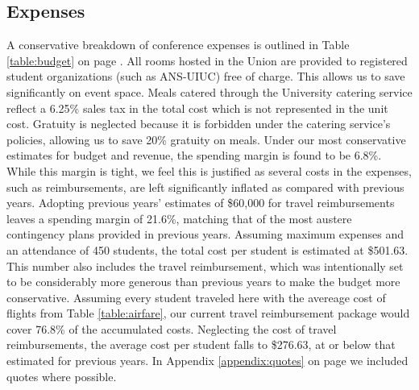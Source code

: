 
\subsection{Expenses}
A conservative breakdown of conference expenses is outlined in Table \ref{table:budget} on page \pageref{table:budget}. All rooms hosted in the Union are provided to registered student organizations (such as ANS-UIUC) free of charge. This allows us to save significantly on event space. Meals catered through the University catering service reflect a 6.25\% sales tax in the total cost which is not represented in the unit cost. Gratuity is neglected because it is forbidden under the catering service’s policies, allowing us to save 20\% gratuity on meals. 
Under our most conservative estimates for budget and revenue, the spending margin is found to be 6.8\%. While this margin is tight, we feel this is justified as several costs in the expenses, such as reimbursements, are left significantly inflated as compared with previous years. Adopting previous years’ estimates of \$60,000 for travel reimbursements leaves a spending margin of 21.6\%, matching that of the most austere contingency plans provided in previous years. 
Assuming maximum expenses and an attendance of 450 students, the total cost per student is estimated at \$501.63. This number also includes the travel reimbursement, which was intentionally set to be considerably more generous than previous years to make the budget more conservative. Assuming every student traveled here with the avereage cost of flights from Table \ref{table:airfare}, our current travel reimbursement package would cover 76.8\% of the accumulated costs. Neglecting the cost of travel reimbursements, the average cost per student falls to \$276.63, at or below that estimated for previous years. In Appendix \ref{appendix:quotes} on page \pageref{appendix:quotes} we included quotes where possible.

